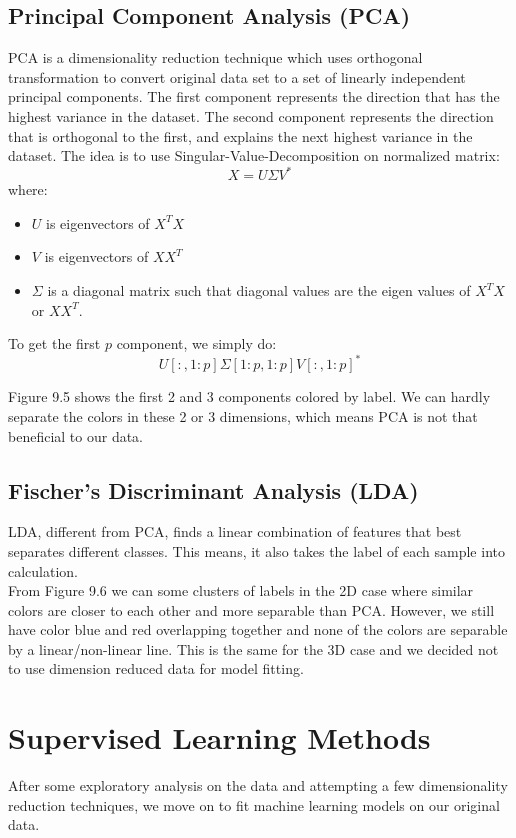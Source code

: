 \documentclass[11pt]{article}
\begin{document}
\subsection{Principal Component Analysis (PCA)}
PCA is a dimensionality reduction technique which uses orthogonal transformation to convert original data set to a set of linearly independent principal components. The first component represents the direction that has the highest variance in the dataset. The second component represents the direction that is orthogonal to the first, and explains the next highest variance in the dataset. The idea is to use Singular-Value-Decomposition on normalized matrix:
$$X = U\Sigma V^*$$
where:
\begin{itemize}
\setlength\itemsep{0cm}
\item $U$ is eigenvectors of $X^TX$
\item $V$ is eigenvectors of $XX^T$
\item $\Sigma$ is a diagonal matrix such that diagonal values are the eigen values of $X^TX$ or $XX^T$.
\end{itemize}
To get the first $p$ component, we simply do:
$$U[:,1:p]\Sigma[1:p,1:p] V[:,1:p]^*$$

\noindent Figure 9.5 shows the first 2 and 3 components colored by label. We can hardly separate the colors in these 2 or 3 dimensions, which means PCA is not that beneficial to our data. \\


\subsection{Fischer's Discriminant Analysis (LDA)}
LDA, different from PCA, finds a linear combination of features that best separates different classes. This means, it also takes the label of each sample into calculation. \\


\noindent From Figure 9.6 we can some clusters of labels in the 2D case where similar colors are closer to each other and more separable than PCA. However, we still have color blue and red overlapping together and none of the colors are separable by a linear/non-linear line. This is the same for the 3D case and we decided not to use dimension reduced data for model fitting.


\section{Supervised Learning Methods}
After some exploratory analysis on the data and attempting a few dimensionality reduction techniques, we move on to fit machine learning models on our original data.
\end{document}
